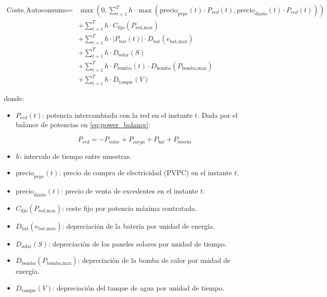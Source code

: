 \begin{equation} \label{eq:cost_regulated}
	\begin{split}
		\text{Coste\_Autoconsumo} = & \max \left(0, \sum_{t=1}^{T} h \cdot \max(\text{precio}_\text{pvpc}(t) \cdot P_{red}(t), \text{precio}_\text{diario}(t) \cdot P_{red}(t)) \right) \\
		                                   & + \sum_{t=1}^{T} h \cdot C_\text{fijo}(P_\text{red,max})                                                                                          \\
		                                   & + \sum_{t=1}^{T} h \cdot |P_\text{bat}(t)| \cdot D_\text{bat}(e_\text{bat,max})                                                                   \\
		                                   & + \sum_{t=1}^{T} h \cdot D_\text{solar}(S)                                                                                                        \\
		                                   & + \sum_{t=1}^{T} h \cdot P_\text{bomba}(t) \cdot D_\text{bomba}(P_\text{bomba,max})                                                               \\
		                                   & + \sum_{t=1}^{T} h \cdot D_\text{tanque}(V)
	\end{split}
\end{equation}

donde:

\begin{itemize}
	\item $P_{red}(t)$: potencia intercambiada con la red en el instante $t$.
	      Dada por el balance de potencias en \eqref{eq:power_balance}:

	      \begin{equation} \label{eq:p_grid}
		      P_{red} =  - P_{solar} + P_{carga} + P_{bat} + P_{bomba}
	      \end{equation}

	\item $h$: intervalo de tiempo entre muestras.
	\item $\text{precio}_\text{pvpc}(t)$: precio de compra de electricidad (PVPC)
	      en el instante $t$.
	\item $\text{precio}_\text{diario}(t)$: precio de venta de excedentes en
	      el instante $t$.
	\item $C_\text{fijo}(P_\text{red,max})$: coste fijo por potencia máxima
	      contratada.
	\item $D_\text{bat}(e_\text{bat,max})$: depreciación de la batería por unidad
	      de energía.
	\item $D_\text{solar}(S)$: depreciación de los paneles solares por unidad de
	      tiempo.
	\item $D_\text{bomba}(P_\text{bomba,max})$: depreciación de la bomba de calor
	      por unidad de energía.
	\item $D_\text{tanque}(V)$: depreciación del tanque de agua por unidad de
	      tiempo.
\end{itemize}


